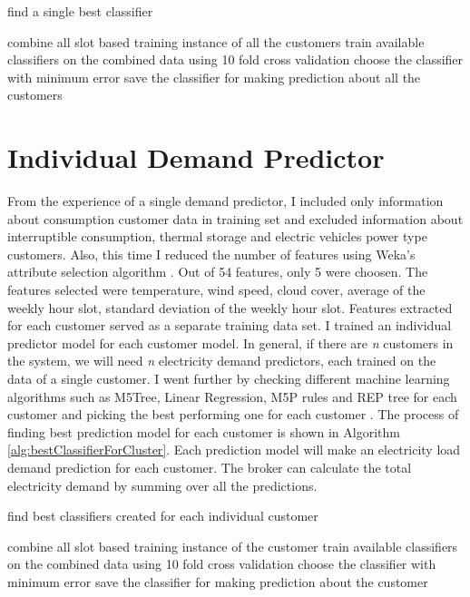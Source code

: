\begin{algorithm}[!h]
\caption{find a single best classifier}
\begin{algorithmic} [1]
\STATE combine all slot based training instance of all the customers
\STATE train available classifiers on the combined data using 10 fold cross validation
\STATE choose the classifier with minimum error
\STATE save the classifier for making prediction about all the customers
\end{algorithmic}
\label{alg:bestSingle}
\end{algorithm}

\section{Individual Demand Predictor}

From the experience of a single demand predictor, I included only information about consumption customer data in training set and excluded information about interruptible consumption, thermal storage and electric vehicles power type customers. Also, this time I reduced the number of features using Weka's attribute selection algorithm \cite{witten2005data}. Out of 54 features, only 5 were choosen. The features selected were temperature, wind speed, cloud cover, average of the weekly hour slot, standard deviation of the weekly hour slot. Features extracted for each customer served as a separate training data set. I trained an individual predictor model for each customer model. In general, if there are \textit{n} customers in the system, we will need \textit{n} electricity demand predictors, each trained on the data of a single customer. I went further by checking different machine learning algorithms such as M5Tree, Linear Regression, M5P rules and REP tree for each customer and picking the best performing one for each customer \cite{witten2005data}. The process of finding best prediction model for each customer is shown in Algorithm \ref{alg:bestClassifierForCluster}. Each prediction model will make an electricity load demand prediction for each customer. The broker can calculate the total electricity demand by summing over all the predictions.

\begin{algorithm}[!h]
\caption{find best classifiers created for each individual customer}
\begin{algorithmic} [1]
    \STATE combine all slot based training instance of the customer
    \STATE train available classifiers on the combined data using 10 fold cross validation
    \STATE choose the classifier with minimum error
    \STATE save the classifier for making prediction about the customer
\ENDFOR 
\end{algorithmic}
\label{alg:bestClassifierIndiv}
\end{algorithm}


